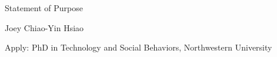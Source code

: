 \documentclass[12pt, a4paper]{article}
\begin{document}
\begin{center}
{\Large Statement of Purpose}
\end{center}

\hfill Joey Chiao-Yin Hsiao
\spacedhrule{0.3em}{0.3em} %

\noindent Apply: PhD in Technology and Social Behaviors, Northwestern University
\end{document}
